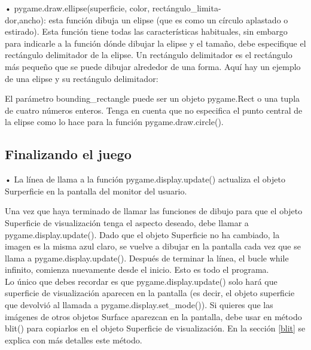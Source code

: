 • {\ttfamily pygame.draw.ellipse(superficie, color, rectángulo\_limita-\\ dor,ancho)}: esta función dibuja un
elipse (que es como un círculo aplastado o estirado). Esta función tiene todas las características habituales, sin embargo para indicarle   a la función dónde dibujar la elipse y el tamaño, debe especifique el rectángulo delimitador de la elipse. Un rectángulo delimitador es el rectángulo más pequeño que se puede dibujar alrededor de una forma. Aquí hay un ejemplo de una elipse y su rectángulo delimitador:
 

El parámetro {\ttfamily bounding\_rectangle} puede ser un objeto {\ttfamily pygame.Rect} o una tupla de cuatro
números enteros. Tenga en cuenta que no especifica el punto central de la elipse como lo hace para la
función {\ttfamily pygame.draw.circle()}.




\subsection*{Finalizando el juego}

• La línea de llama a la función {\ttfamily pygame.display.update()} actualiza el objeto Surperficie
 en la pantalla del monitor del usuario.
 
Una vez que haya terminado de llamar las funciones de dibujo para que el objeto Superficie de visualización 
tenga el aspecto deseado, debe llamar a {\ttfamily pygame.display.update()}. Dado que el objeto Superficie no ha
cambiado, la imagen es la misma azul claro, se vuelve a dibujar en la pantalla cada vez que se llama a
   {\ttfamily pygame.display.update()}. 
Después de terminar la línea, el bucle {\ttfamily  while} infinito, comienza nuevamente desde el inicio. 
Esto es todo el programa. \\


Lo único que debes recordar es que {\ttfamily pygame.display.update()} solo hará que superficie de visualización aparecen en la pantalla 
(es decir, el objeto superficie que devolvió al llamada a  {\ttfamily pygame.display.set\_mode()}). Si quieres que las imágenes de otros objetos Surface aparezcan en la pantalla, debe usar en método {\ttfamily blit()} para copiarlos en el objeto Superficie de visualización. En la sección \ref{blit} se explica con más detalles este método.


